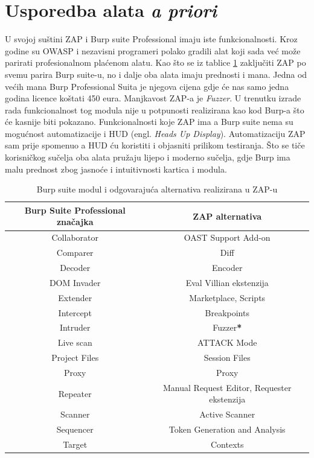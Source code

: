 \section{Usporedba alata \textit{a priori}}
U svojoj suštini ZAP i Burp suite Professional imaju iste funkcionalnosti. Kroz godine su OWASP i nezavisni programeri polako gradili alat koji sada već može parirati profesionalnom
plaćenom alatu.
Kao što se iz tablice \ref{tbl:usporedba} zaključiti ZAP po svemu parira Burp suite-u, no i dalje oba alata imaju prednosti i mana. Jedna od većih mana Burp Professional Suita je njegova cijena gdje će nas samo jedna godina licence koštati 450 eura.
Manjkavost ZAP-a je \textit{Fuzzer}. U trenutku izrade rada funkcionalnost tog modula nije u potpunosti realizirana kao kod Burp-a što će kasnije biti pokazano.
Funkcionalnosti koje ZAP ima a Burp suite nema su mogućnost automatizacije i HUD (engl. \textit{Heads Up Display}). Automatizaciju ZAP sam prije spomenuo a HUD ću koristiti i objasniti prilikom testiranja.
Što se tiče korisničkog sučelja oba alata pružaju lijepo i moderno sučelja, gdje Burp ima malu prednost zbog jasnoće i intuitivnosti kartica i modula.
\begin{table}[H]
  \centering
  \caption{Burp suite modul i odgovarajuća alternativa realizirana u ZAP-u\cite{burp_to_zap}}
  \begin{tabular}{|c|c|}
      \hline
      \textbf{Burp Suite Professional značajka} & \textbf{ZAP alternativa} \\
      \hline
      Collaborator & OAST Support Add-on \\
      Comparer & Diff \\
      Decoder & Encoder \\
      DOM Invader & Eval Villian ekstenzija \\
      Extender & Marketplace, Scripts \\
      Intercept & Breakpoints \\
      Intruder & Fuzzer\textbf{*} \\
      Live scan & ATTACK Mode \\
      Project Files & Session Files \\
      Proxy & Proxy \\
      Repeater & Manual Request Editor, Requester ekstenzija \\
      Scanner & Active Scanner \\
      Sequencer & Token Generation and Analysis \\
      Target & Contexts \\
      \hline
  \end{tabular}
\label{tbl:usporedba}
\end{table}